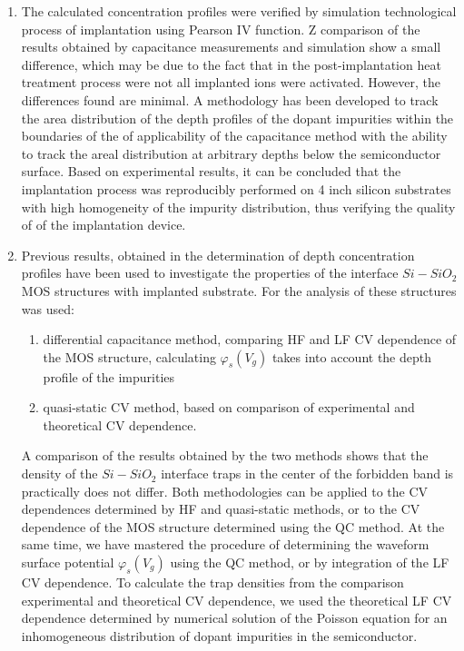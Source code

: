 \begin{enumerate}
\item The calculated concentration profiles were verified by
  simulation technological process of implantation using Pearson IV
  function. Z comparison of the results obtained by capacitance
  measurements and simulation show a small difference, which may be
  due to the fact that in the post-implantation heat treatment process
  were not all implanted ions were activated. However, the differences
  found are minimal. A methodology has been developed to track the
  area distribution of the depth profiles of the dopant impurities
  within the boundaries of the of applicability of the capacitance
  method with the ability to track the areal distribution at arbitrary
  depths below the semiconductor surface. Based on experimental
  results, it can be concluded that the implantation process was
  reproducibly performed on 4 inch silicon substrates with high
  homogeneity of the impurity distribution, thus verifying the quality
  of of the implantation device.


\item Previous results, obtained in the determination of depth
  concentration profiles have been used to investigate the properties
  of the interface $Si-SiO_{2}$ MOS structures with implanted
  substrate. For the analysis of these structures was used:

  \begin{enumerate}
  \item differential capacitance method, comparing HF and LF CV
    dependence of the MOS structure, calculating $\varphi_{s} (V_{g})$
    takes into account the depth profile of the impurities
  \item quasi-static CV method, based on comparison of experimental
    and theoretical CV dependence.
  \end{enumerate}

  A comparison of the results obtained by the two methods shows that
  the density of the $Si-SiO_{2}$ interface traps in the center of the
  forbidden band is practically does not differ. Both methodologies
  can be applied to the CV dependences determined by HF and
  quasi-static methods, or to the CV dependence of the MOS structure
  determined using the QC method. At the same time, we have mastered
  the procedure of determining the waveform surface potential
  $\varphi_s (V_g)$ using the QC method, or by integration of the LF
  CV dependence. To calculate the trap densities from the comparison
  experimental and theoretical CV dependence, we used the theoretical
  LF CV dependence determined by numerical solution of the Poisson
  equation for an inhomogeneous distribution of dopant impurities in
  the semiconductor.


\end{enumerate}
